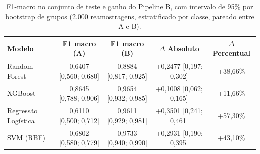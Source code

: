 \begin{table}[htbp]
  \centering
  \caption{F1-macro no conjunto de teste e ganho do Pipeline B, com intervalo de 95\% por bootstrap de grupos (2.000 reamostragens, estratificado por classe, pareado entre A e B).}
  \label{tab:ganho}
  \begin{tabular}{lcccc}
    \toprule
    Modelo & F1 macro (A) & F1 macro (B) & $\Delta$ Absoluto & $\Delta$ Percentual \\
    \midrule
    Random Forest & 0,6407 [0,560; 0,680] & 0,8884 [0,817; 0,925] & +0,2477 [0,197; 0,302] & +38,66\% \\
    XGBoost & 0,8645 [0,788; 0,906] & 0,9654 [0,932; 0,985] & +0,1008 [0,062; 0,165] & +11,66\% \\
    Regressão Logística & 0,6110 [0,500; 0,712] & 0,9611 [0,929; 0,981] & +0,3501 [0,241; 0,461] & +57,30\% \\
    SVM (RBF) & 0,6802 [0,580; 0,779] & 0,9733 [0,940; 0,990] & +0,2931 [0,190; 0,395] & +43,10\% \\
    \bottomrule
  \end{tabular}
\end{table}
